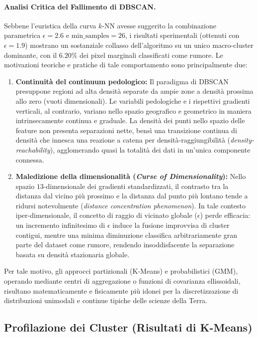 \documentclass[a4paper,12pt]{article}
\begin{document}
\paragraph{Analisi Critica del Fallimento di DBSCAN.}
Sebbene l'euristica della curva $k$-NN avesse suggerito la combinazione parametrica $\epsilon = 2.6$ e $\text{min\_samples} = 26$, i risultati sperimentali (ottenuti con $\epsilon = 1.9$) mostrano un sostanziale collasso dell'algoritmo su un unico macro-cluster dominante, con il $6.20\%$ dei pixel marginali classificati come rumore. Le motivazioni teoriche e pratiche di tale comportamento sono principalmente due:

\begin{enumerate}
    \item \textbf{Continuità del continuum pedologico:} Il paradigma di DBSCAN presuppone regioni ad alta densità separate da ampie zone a densità prossima allo zero (vuoti dimensionali). Le variabili pedologiche e i rispettivi gradienti verticali, al contrario, variano nello spazio geografico e geometrico in maniera intrinsecamente continua e graduale. La densità dei punti nello spazio delle feature non presenta separazioni nette, bensì una transizione continua di densità che innesca una reazione a catena per densità-raggiungibilità (\emph{density-reachability}), agglomerando quasi la totalità dei dati in un'unica componente connessa.
    
    \item \textbf{Maledizione della dimensionalità (\emph{Curse of Dimensionality}):} Nello spazio $13$-dimensionale dei gradienti standardizzati, il contrasto tra la distanza dal vicino più prossimo e la distanza dal punto più lontano tende a ridursi notevolmente (\emph{distance concentration phenomenon}). In tale contesto iper-dimensionale, il concetto di raggio di vicinato globale ($\epsilon$) perde efficacia: un incremento infinitesimo di $\epsilon$ induce la fusione improvvisa di cluster contigui, mentre una minima diminuzione classifica arbitrariamente gran parte del dataset come rumore, rendendo insoddisfacente la separazione basata su densità stazionaria globale.
\end{enumerate}
Per tale motivo, gli approcci partizionali (K-Means) e probabilistici (GMM), operando mediante centri di aggregazione o funzioni di covarianza ellissoidali, risultano matematicamente e fisicamente più idonei per la discretizzazione di distribuzioni unimodali e continue tipiche delle scienze della Terra.

\subsection{Profilazione dei Cluster (Risultati di K-Means)}
\end{document}
